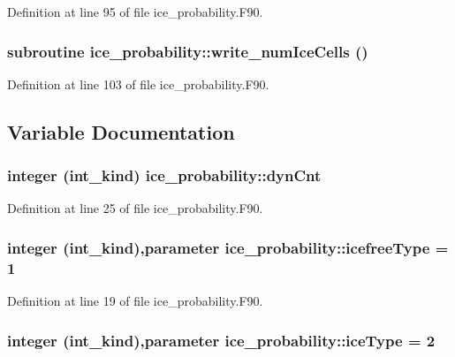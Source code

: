 Definition at line 95 of file ice\_\-probability.F90.\hypertarget{namespaceice__probability_ad845a3b0d89f3988e7360443aaade9c8}{
\subsubsection[{write\_\-numIceCells}]{\setlength{\rightskip}{0pt plus 5cm}subroutine ice\_\-probability::write\_\-numIceCells ()}}
\label{namespaceice__probability_ad845a3b0d89f3988e7360443aaade9c8}


Definition at line 103 of file ice\_\-probability.F90.

\subsection{Variable Documentation}
\hypertarget{namespaceice__probability_a4ee8ce398fcfff914562169106ab0f2e}{
\subsubsection[{dynCnt}]{\setlength{\rightskip}{0pt plus 5cm}integer (int\_\-kind) {\bf ice\_\-probability::dynCnt}}}
\label{namespaceice__probability_a4ee8ce398fcfff914562169106ab0f2e}


Definition at line 25 of file ice\_\-probability.F90.\hypertarget{namespaceice__probability_ac98da6fa34da83bf3df15cd5c9e6e2e5}{
\subsubsection[{icefreeType}]{\setlength{\rightskip}{0pt plus 5cm}integer (int\_\-kind),parameter {\bf ice\_\-probability::icefreeType} = 1}}
\label{namespaceice__probability_ac98da6fa34da83bf3df15cd5c9e6e2e5}


Definition at line 19 of file ice\_\-probability.F90.\hypertarget{namespaceice__probability_afcfe5a08d7e0f132380df3a8716e38df}{
\subsubsection[{iceType}]{\setlength{\rightskip}{0pt plus 5cm}integer (int\_\-kind),parameter {\bf ice\_\-probability::iceType} = 2}}
\label{namespaceice__probability_afcfe5a08d7e0f132380df3a8716e38df}


